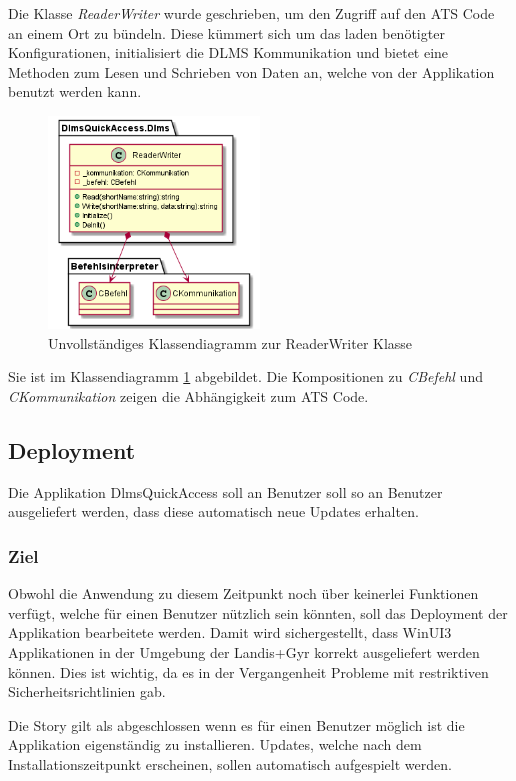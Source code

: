 Die Klasse \textit{ReaderWriter} wurde geschrieben, um den Zugriff auf den \ac{ATS} Code an einem Ort zu bündeln.
Diese kümmert sich um das laden benötigter Konfigurationen, initialisiert die \ac{DLMS} Kommunikation und bietet eine Methoden zum Lesen und Schrieben von Daten an, welche von der Applikation benutzt werden kann.
\begin{figure}[H]
   \centering
   \includegraphics[width=0.5\textwidth]{gfx/readerwriter.png}
   \caption{
      Unvollständiges Klassendiagramm zur ReaderWriter Klasse
      }
      \label{fig:readerwriter}
\end{figure}
Sie ist im Klassendiagramm \ref{fig:readerwriter} abgebildet.
Die Kompositionen zu \textit{CBefehl} und \textit{CKommunikation} zeigen die Abhängigkeit zum \ac{ATS} Code.



\subsection{Deployment}
\dq Die Applikation DlmsQuickAccess soll an Benutzer soll so an Benutzer ausgeliefert werden, dass diese automatisch neue Updates erhalten.\dq

\subsubsection{Ziel}
Obwohl die Anwendung zu diesem Zeitpunkt noch über keinerlei Funktionen verfügt, welche für einen Benutzer nützlich sein könnten, soll das Deployment der Applikation bearbeitete werden.
Damit wird sichergestellt, dass WinUI3 Applikationen in der Umgebung der Landis+Gyr korrekt ausgeliefert werden können.
Dies ist wichtig, da es in der Vergangenheit Probleme mit restriktiven Sicherheitsrichtlinien gab.

Die Story gilt als abgeschlossen wenn es für einen Benutzer möglich ist die Applikation eigenständig zu installieren.
Updates, welche nach dem Installationszeitpunkt erscheinen, sollen automatisch aufgespielt werden.

